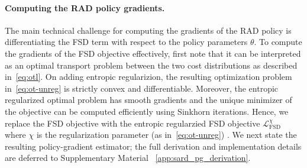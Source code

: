 \paragraph{Computing the RAD policy gradients.}
The main technical challenge for computing the gradients of the RAD policy is differentiating the FSD term with respect to the policy parameters $\theta$.
To compute the gradients of the FSD objective effectively, first note that it can be interpreted as an optimal transport problem between the two cost distributions as described in~\eqref{eq:otl}. On adding entropic regularizion, the resulting optimization problem in~\eqref{eq:ot-unreg} is strictly convex and differentiable. Moreover, the entropic regularized optimal problem has smooth gradients and the unique minimizer of the objective can be computed efficiently using Sinkhorn iterations. Hence, we replace the FSD objective with the entropic regularzied FSD objective $\mathcal{L}^{\chi}_{\mathrm{FSD}}$ where $\chi$ is the regularization parameter (as in~\eqref{eq:ot-unreg})  . We next state the resulting policy-gradient estimator; the full derivation and implementation details are deferred to Supplementary Material ~\ref{app:sard_pg_derivation}.

